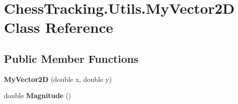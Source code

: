 \hypertarget{class_chess_tracking_1_1_utils_1_1_my_vector2_d}{}\section{Chess\+Tracking.\+Utils.\+My\+Vector2D Class Reference}
\label{class_chess_tracking_1_1_utils_1_1_my_vector2_d}
\subsection*{Public Member Functions}
\begin{DoxyCompactItemize}
\item 
\mbox{\label{class_chess_tracking_1_1_utils_1_1_my_vector2_d_a168a72240e38bed266bd725676d70348}} 
{\bfseries My\+Vector2D} (double x, double y)
\item 
\mbox{\label{class_chess_tracking_1_1_utils_1_1_my_vector2_d_acee11843aef4e1ace54fcd47d0c03953}} 
double {\bfseries Magnitude} ()
\end{DoxyCompactItemize}
